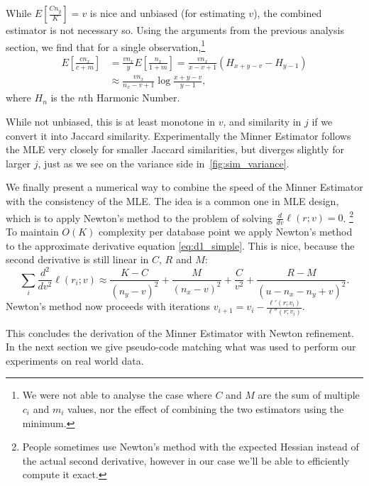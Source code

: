 \hspace{.2em}

While $E[\frac{C n_y}{K}] = v$ is nice and unbiased (for estimating $v$), the combined estimator is not necessary so.
Using the arguments from the previous analysis section, we find that for a single observation,\footnote{We were not able to analyse the case where $C$ and $M$ are the sum of multiple $c_i$ and $m_i$ values, nor the effect of combining the two estimators using the minimum.}
\begin{align}
   E[\frac{c n_x}{c+m}]
   &= \frac{v n_x}{y} E[\frac{n_x}{1+m}]
   = \frac{v n_x}{x-v+1} (H_{x+y-v} - H_{y-1})
 \\&\approx \frac{v n_x}{n_x-v+1} \log\frac{x+y-v}{y-1},
\end{align}
where $H_n$ is the $n$th Harmonic Number.

While not unbiased, this is at least monotone in $v$, and similarity in $j$ if we convert it into Jaccard similarity.
Experimentally the Minner Estimator follows the MLE very closely for smaller Jaccard similarities, but diverges slightly for larger $j$, just as we see on the variance side in~\cref{fig:sim_variance}.

\hspace{.2em}

We finally present a numerical way to combine the speed of the Minner Estimator with the consistency of the MLE.
The idea is a common one in MLE design, which is to apply Newton's method to the problem of solving $\frac{d}{dv}\ell(r;v)=0$.%
\footnote{People sometimes use Newton's method with the expected Hessian instead of the actual second derivative, however in our case we'll be able to efficiently compute it exact.}
To maintain $O(K)$ complexity per database point we apply Newton's method to the approximate derivative equation \cref{eq:d1_simple}.
This is nice, because the second derivative is still linear in $C$, $R$ and $M$:
\[
   \sum_i\frac{d^2}{dv^2}\ell(r_i; v) \approx
   \frac{K-C}{(n_y-v)^2} 
   +\frac{M}{(n_x-v)^2} 
   +\frac{C}{v^2}
   +\frac{R-M}{(u-n_x-n_y+v)^2}
   .
   \label{eq:d2_simple}
\]
Newton's method now proceeds with iterations
$v_{i+1} = v_i - \frac{\ell'(r; v_i)}{\ell''(r; v_i)}$.

This concludes the derivation of the Minner Estimator with Newton refinement.
In the next section we give pseudo-code matching what was used to perform our experiments on real world data.


